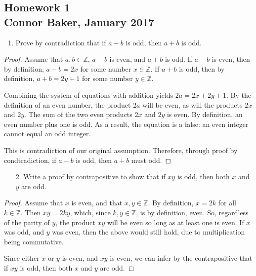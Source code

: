 \documentclass[10pt]{article}
\theoremstyle{definition}
\theoremstyle{plain}
\newcommand{\Z}{\mathbb{Z}}
\begin{document}
\begin{center}
\subsection*{Homework 1\\Connor Baker, January 2017}
\end{center}

\begin{enumerate}
\item Prove by contradiction that if $a-b$ is odd, then $a+b$ is odd.
\end{enumerate}

\begin{proof}
  Assume that $a,b\in\Z$, $a-b$ is even, and $a+b$ is odd. If $a-b$ is even, then by definition, $a-b=2x$ for some number $x\in\Z$. If $a+b$ is odd, then by definition, $a+b=2y+1$ for some number $y\in\Z$.
  \\
  \par Combining the system of equations with addition yields $2a=2x+2y+1$. By the definition of an even number, the product $2a$ will be even, as will the products $2x$ and $2y$. The sum of the two even products $2x$ and $2y$ is even. By definition, an even number plus one is odd. As a result, the equation is a false: an even integer cannot equal an odd integer.
  \\
  \par This is contradiction of our original assumption. Therefore, through proof by condtradiction, if $a-b$ is odd, then $a+b$ must odd.
\end{proof}

\begin{enumerate}
\item[2.] Write a proof by contrapositive to show that if $xy$ is odd, then both $x$ and $y$ are odd.
\end{enumerate}

\begin{proof}
  Assume that $x$ is even, and that $x,y\in\Z$. By definition, $x=2k$ for all $k\in\Z$. Then $xy=2ky$, which, since $k,y\in\Z$, is by definition, even. So, regardless of the parity of $y$, the product $xy$ will be even so long as at least one is even. If $x$ was odd, and $y$ was even, then the above would still hold, due to multiplication being commutative.
  \\
  \par Since either $x$ or $y$ is even, and $xy$ is even, we can infer by the contrapositive that if $xy$ is odd, then both $x$ and $y$ are odd.
\end{proof}
\end{document}
